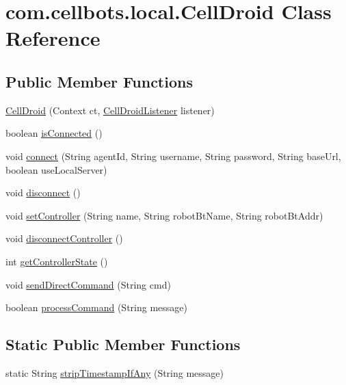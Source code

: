 \hypertarget{classcom_1_1cellbots_1_1local_1_1_cell_droid}{\section{com.\-cellbots.\-local.\-Cell\-Droid Class Reference}
\label{classcom_1_1cellbots_1_1local_1_1_cell_droid}
}
\subsection*{Public Member Functions}
\begin{DoxyCompactItemize}
\item 
\hyperlink{classcom_1_1cellbots_1_1local_1_1_cell_droid_a7d4e0a97085a3bc42d3ac3bebffc0a0a}{Cell\-Droid} (Context ct, \hyperlink{interfacecom_1_1cellbots_1_1local_1_1_cell_droid_manager_1_1_cell_droid_listener}{Cell\-Droid\-Listener} listener)
\item 
boolean \hyperlink{classcom_1_1cellbots_1_1local_1_1_cell_droid_a93b5d935afcc45a229e7d93c58925d4b}{is\-Connected} ()
\item 
void \hyperlink{classcom_1_1cellbots_1_1local_1_1_cell_droid_afece64b855a9c654071aa7e162a3bd08}{connect} (String agent\-Id, String username, String password, String base\-Url, boolean use\-Local\-Server)
\item 
void \hyperlink{classcom_1_1cellbots_1_1local_1_1_cell_droid_afa0575a9750dc97438c87444ffc4f0a1}{disconnect} ()
\item 
void \hyperlink{classcom_1_1cellbots_1_1local_1_1_cell_droid_ae92137971a18bb798ce3602adab755a0}{set\-Controller} (String name, String robot\-Bt\-Name, String robot\-Bt\-Addr)
\item 
void \hyperlink{classcom_1_1cellbots_1_1local_1_1_cell_droid_a82e0f8a92d8b6d479cc5a4a2d4e297a3}{disconnect\-Controller} ()
\item 
int \hyperlink{classcom_1_1cellbots_1_1local_1_1_cell_droid_a453658a1edf28c4d1a616485b6445fe6}{get\-Controller\-State} ()
\item 
void \hyperlink{classcom_1_1cellbots_1_1local_1_1_cell_droid_aec2f40f805e4791e45b3cc830f772385}{send\-Direct\-Command} (String cmd)
\item 
boolean \hyperlink{classcom_1_1cellbots_1_1local_1_1_cell_droid_a0642cc39b80c6a48031d06e099e5532c}{process\-Command} (String message)
\end{DoxyCompactItemize}
\subsection*{Static Public Member Functions}
\begin{DoxyCompactItemize}
\item 
static String \hyperlink{classcom_1_1cellbots_1_1local_1_1_cell_droid_a0831a5b6579ff4ec28e40130ce2851f2}{strip\-Timestamp\-If\-Any} (String message)
\end{DoxyCompactItemize}

